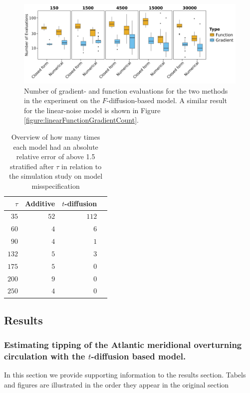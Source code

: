 \begin{figure}[h!]
    \begin{center}
    \includegraphics[scale = .08]{figures/function_gradient_count_F_plot.jpeg}     
    \caption{Number of gradient- and function evaluations for the two methods in the experiment on the $F$-diffusion-based model. A similar result for the linear-noise model is shown in Figure \ref{figure:linearFunctionGradientCount}.}
    \label{figure:FFunctionGradientCount}   
    \end{center}
\end{figure}
\begin{table}[h!]
    \centering
    \begin{tabular}{rrrr}
    $\tau$ & Additive & $t$-diffusion \\ 
      \hline
      $35$ &  $52$ & $112$ \\ 
      $60$ &   $4$ & $6$ \\ 
      $90$ &   $4$ & $1$ \\ 
      $132$ &  $5$ & $3$ \\ 
      $175$ &  $5$ & $0$ \\ 
      $200$ &  $9$ & $0$ \\ 
      $250$ &  $4$ & $0$ \\ 
       \hline
    \end{tabular}
    \caption{Overview of how many times each model had an absolute relative error of above 1.5 stratified after $\tau$ in relation to the simulation study on model misspecification}
    \label{table:AREabove1.5tauSim}
    \end{table}
\newpage
    \subsection{Results}
    \subsubsection{Estimating tipping of the Atlantic meridional overturning circulation with the \texorpdfstring{$t$}{t}-diffusion based model.}
    In this section we provide supporting information to the results section. Tabels and figures are illustrated in the order they appear in the original section

